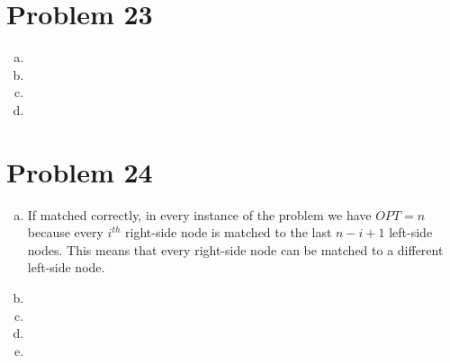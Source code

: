 \documentclass{article}[12pt]
\begin{document}
\section{Problem 23}
\begin{enumerate}[(a)]
\item
\item
\item
\item
\end{enumerate}
\section{Problem 24}
\begin{enumerate}[(a)]
\item If matched correctly, in every instance of the problem we have $OPT = n$ because every $i^{th}$ right-side node is matched to the last $n - i + 1$ left-side nodes. This means that every right-side node can be matched to a different left-side node. 
 
\item
\item
\item
\item
\end{enumerate}
\end{document}
